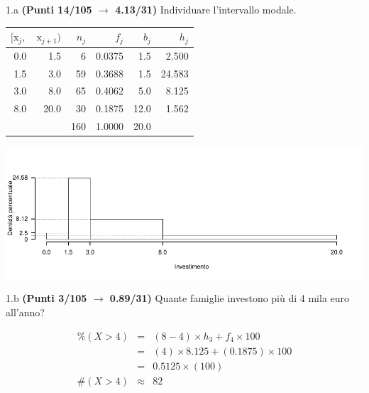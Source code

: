 \documentclass[
  11pt,
]{book}
\theoremstyle{mytheoremstyle}
\theoremstyle{mydefstyle}
\newenvironment{sol}
  {
  \begin{tcolorbox}[enhanced,breakable,arc=0.1mm,boxrule=1pt,colback=white,colframe=iblue,
  title=\bf \fontfamily{lmss}\selectfont \hspace{.5 cm} Soluzione,drop fuzzy shadow]

}{
\end{tcolorbox}
  }
\begin{document}
1.a \textbf{(Punti 14/105 \(\rightarrow\) 4.13/31)} Individuare l'intervallo modale.

\begin{sol}

\begin{table}[H]
\centering
\begin{tabular}{rrrrrr}
\toprule
$[\text{x}_j,$ & $\text{x}_{j+1})$ & $n_j$ & $f_j$ & $b_j$ & $h_j$\\
\midrule
0.0 & 1.5 & 6 & 0.0375 & 1.5 & 2.500\\
1.5 & 3.0 & 59 & 0.3688 & 1.5 & 24.583\\
3.0 & 8.0 & 65 & 0.4062 & 5.0 & 8.125\\
8.0 & 20.0 & 30 & 0.1875 & 12.0 & 1.562\\
 &  & 160 & 1.0000 & 20.0 & \\
\bottomrule
\end{tabular}
\end{table}

\begin{center}\includegraphics{Esami_passati_con_soluzioni_files/figure-latex/2024-53-1} \end{center}

\end{sol}

1.b \textbf{(Punti 3/105 \(\rightarrow\) 0.89/31)} Quante famiglie investono più di 4 mila euro all'anno?

\begin{sol}
\begin{eqnarray*}
     \%(X> 4 ) &=& ( 8 - 4 )\times h_{ 3 }+ f_{ 4 }\times 100 \\
              &=& ( 4 )\times 8.125 + ( 0.1875 )\times 100 \\
              &=&  0.5125 \times(100)\\
     \#(X> 4 ) &\approx& 82 
         \end{eqnarray*}

\end{sol}
\end{document}
